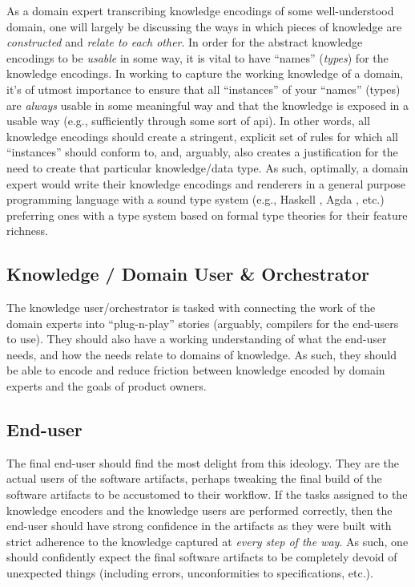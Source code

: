 As a domain expert transcribing knowledge encodings of some well-understood
domain, one will largely be discussing the ways in which pieces of knowledge are
\textit{constructed} and \textit{relate to each other}. In order for the
abstract knowledge encodings to be \textit{usable} in some way, it is vital to
have ``names'' (\textit{types}) for the knowledge encodings. In working to
capture the working knowledge of a domain, it's of utmost importance to ensure
that all ``instances'' of your ``names'' (types) are \textit{always} usable in
some meaningful way and that the knowledge is exposed in a usable way (e.g.,
sufficiently through some sort of \acs{api}). In other words, all knowledge
encodings should create a stringent, explicit set of rules for which all
``instances'' should conform to, and, arguably, also creates a justification for
the need to create that particular knowledge/data type. As such, optimally, a
domain expert would write their knowledge encodings and renderers in a general
purpose programming language with a sound type system (e.g., Haskell
\cite{Haskell2010}, Agda \cite{Norell2007}, etc.) \textemdash{} preferring ones
with a type system based on formal type theories for their feature richness.

\subsection{Knowledge / Domain User \& Orchestrator}
\label{chap:ideology:sec:a_prospective_workflow:subsec:knowledge_orchestrator}

The knowledge user/orchestrator is tasked with connecting the work of the domain
experts into ``plug-n-play'' stories (arguably, compilers for the end-users to
use). They should also have a working understanding of what the end-user needs,
and how the needs relate to domains of knowledge. As such, they should be able
to encode and reduce friction between knowledge encoded by domain experts and
the goals of product owners.

\subsection{End-user}
\label{chap:ideology:sec:a_prospective_workflow:subsec:end_user}

The final end-user should find the most delight from this ideology. They are the
actual users of the software artifacts, perhaps tweaking the final build of the
software artifacts to be accustomed to their workflow. If the tasks assigned to
the knowledge encoders and the knowledge users are performed correctly, then the
end-user should have strong confidence in the artifacts as they were built with
strict adherence to the knowledge captured at \textit{every step of the way}. As
such, one should confidently expect the final software artifacts to be
completely devoid of unexpected things (including errors, unconformities to
specifications, etc.).

